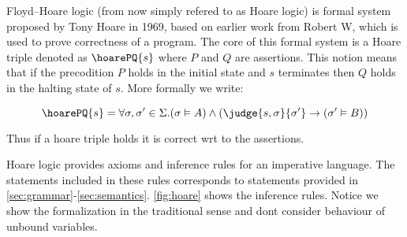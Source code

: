 Floyd–Hoare logic (from now simply refered to as Hoare logic) is formal system proposed by Tony Hoare in 1969,
based on earlier work from Robert W, which is used to prove correctness of a program.
The core of this formal system is a Hoare triple denoted as $\hoarePQ{s}$
where $P$ and $Q$ are assertions. This notion means that if the precodition $P$ holds in the initial state
and $s$ terminates then $Q$ holds in the halting state of $s$. More formally we write:

$$\hoarePQ{s} = \forall \sigma, \sigma' \in \Sigma. (\sigma \vDash A) \wedge ( \judge{s, \sigma}{\sigma'} \rightarrow (\sigma' \vDash B))$$

Thus if a hoare triple holds it is correct wrt to the assertions.

Hoare logic provides axioms and inference rules for an imperative language.
The statements included in these rules corresponds to statements provided in \autoref{sec:grammar}-\autoref{sec:semantics}. \autoref{fig:hoare} shows the inference rules.
Notice we show the formalization in the traditional sense and dont consider behaviour of unbound variables.

\begin{figure}[h!]

\inference[HSkip]{}
{}

\inference[HAssign]{}
{}

{}

{}

{}

{}

\end{figure}

